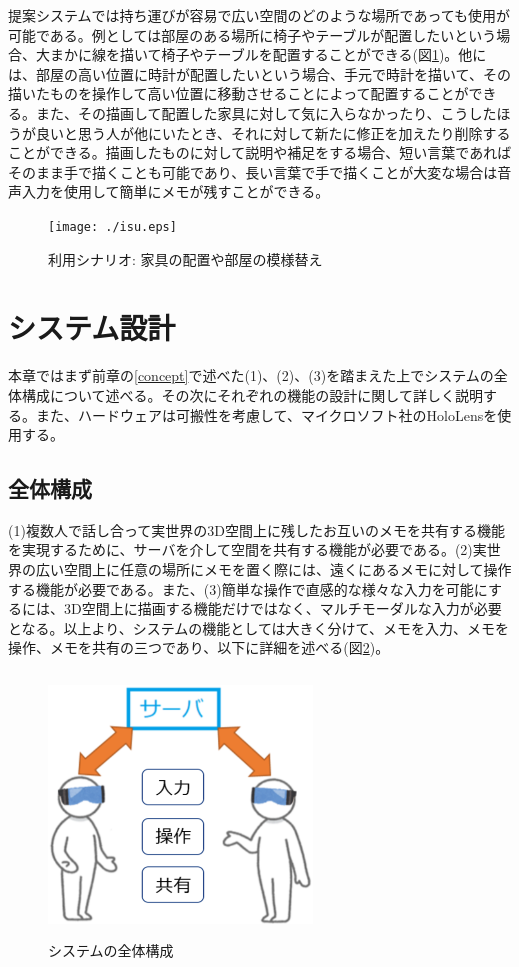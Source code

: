 \documentclass[11pt,a4j, titlepage]{jarticle} %
\begin{document}
提案システムでは持ち運びが容易で広い空間のどのような場所であっても使用が可能である。例としては部屋のある場所に椅子やテーブルが配置したいという場合、大まかに線を描いて椅子やテーブルを配置することができる(図\ref{fig:isu})。他には、部屋の高い位置に時計が配置したいという場合、手元で時計を描いて、その描いたものを操作して高い位置に移動させることによって配置することができる。また、その描画して配置した家具に対して気に入らなかったり、こうしたほうが良いと思う人が他にいたとき、それに対して新たに修正を加えたり削除することができる。描画したものに対して説明や補足をする場合、短い言葉であればそのまま手で描くことも可能であり、長い言葉で手で描くことが大変な場合は音声入力を使用して簡単にメモが残すことができる。

\begin{figure}[H]
  \begin{center}
    \texttt{[image: ./isu.eps]}
    \caption{利用シナリオ: 家具の配置や部屋の模様替え}
    \label{fig:isu}
  \end{center}
\end{figure}

\newpage
\section{システム設計}
本章ではまず前章の\ref{concept}で述べた(1)、(2)、(3)を踏まえた上でシステムの全体構成について述べる。その次にそれぞれの機能の設計に関して詳しく説明する。また、ハードウェアは可搬性を考慮して、マイクロソフト社のHoloLens\cite{hololens}を使用する。

\subsection{全体構成}
(1)複数人で話し合って実世界の3D空間上に残したお互いのメモを共有する機能を実現するために、サーバを介して空間を共有する機能が必要である。(2)実世界の広い空間上に任意の場所にメモを置く際には、遠くにあるメモに対して操作する機能が必要である。また、(3)簡単な操作で直感的な様々な入力を可能にするには、3D空間上に描画する機能だけではなく、マルチモーダルな入力が必要となる。以上より、システムの機能としては大きく分けて、メモを入力、メモを操作、メモを共有の三つであり、以下に詳細を述べる(図\ref{fig:systemzentai})。

\begin{figure}[H]
  \begin{center}
    \includegraphics[clip,height=7.0cm,width=7.0cm]{./systemzentai.eps}
    \caption{システムの全体構成}
    \label{fig:systemzentai}
  \end{center}
\end{figure}
\end{document}
